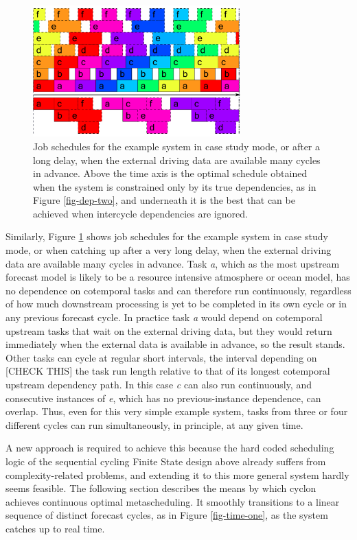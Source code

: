 \documentclass[11pt,a4paper]{article}
\begin{document}
\begin{figure} 
    \begin{center} 
        \includegraphics[width=8cm]{timeline-two}
    \end{center} 
    \caption{\small Job schedules for the example system in case study
    mode, or after a long delay, when the external driving data are
    available many cycles in advance. Above the time axis is the optimal
    schedule obtained when the system is constrained only by its true
    dependencies, as in Figure \ref{fig-dep-two}, and underneath it is
    the best that can be achieved when intercycle dependencies are
    ignored.} 
    \label{fig-time-two}
\end{figure} 

Similarly, Figure \ref{fig-time-two} shows job schedules for the example
system in case study mode, or when catching up after a very long delay,
when the external driving data are available many cycles in advance.
Task {\em a}, which as the most upstream forecast model is likely to be
a resource intensive atmosphere or ocean model, has no dependence on
cotemporal tasks and can therefore run continuously, regardless of how
much downstream processing is yet to be completed in its own cycle or in
any previous forecast cycle. In practice task {\em a} would depend on
cotemporal upstream tasks that wait on the external driving data, but
they would return immediately when the external data is available in
advance, so the result stands. Other tasks can cycle at regular short
intervals, the interval depending on [CHECK THIS] the task run length
relative to that of its longest cotemporal upstream dependency path. In
this case {\em c} can also run continuously, and consecutive instances
of {\em e}, which has no previous-instance dependence, can overlap.
Thus, even for this very simple example system, tasks from three or four
different cycles can run simultaneously, in principle, at any given
time. 

A new approach is required to achieve this because the hard coded
scheduling logic of the sequential cycling Finite State design above
already suffers from complexity-related problems, and extending it to
this more general system hardly seems feasible. The following section
describes the means by which cyclon achieves continuous optimal
metascheduling. It smoothly transitions to a linear sequence of distinct
forecast cycles, as in Figure \ref{fig-time-one}, as the system catches
up to real time.  
\end{document}
